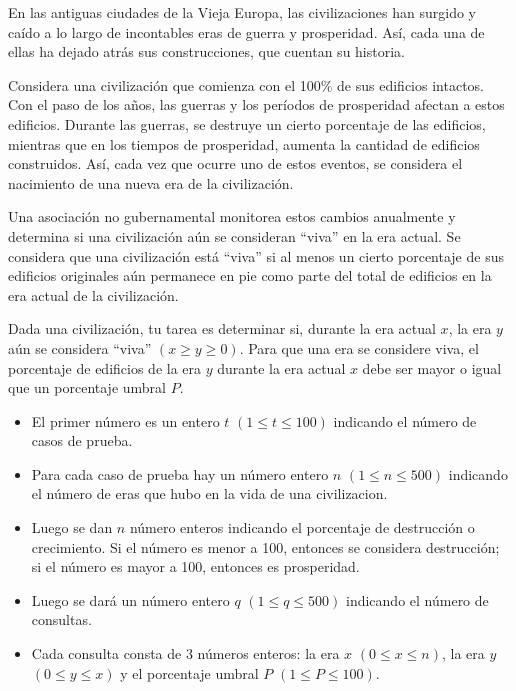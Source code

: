 
En las antiguas ciudades de la Vieja Europa, las civilizaciones han surgido y caído a lo largo de incontables eras de guerra y prosperidad. Así, cada una de ellas ha dejado atrás sus construcciones, que cuentan su historia.

Considera una civilización que comienza con el 100\% de sus edificios intactos. Con el paso de los años, las guerras y los períodos de prosperidad afectan a estos edificios. Durante las guerras, se destruye un cierto porcentaje de las edificios, mientras que en los tiempos de prosperidad, aumenta la cantidad de edificios construidos. Así, cada vez que ocurre uno de estos eventos, se considera el nacimiento de una nueva era de la civilización.

Una asociación no gubernamental monitorea estos cambios anualmente y determina si una civilización aún se consideran ``viva'' en la era actual. Se considera que una civilización está ``viva'' si al menos un cierto porcentaje de sus edificios originales aún permanece en pie como parte del total de edificios en la era actual de la civilización.

Dada una civilización, tu tarea es determinar si, durante la era actual $x$, la era $y$ aún se considera ``viva'' $(x \geq y \geq 0)$. Para que una era se considere viva, el porcentaje de edificios de la era $y$ durante la era actual $x$ debe ser mayor o igual que un porcentaje umbral $P$.


\begin{itemize}
    \item El primer número es un entero $t$ $(1 \leq t \leq 100)$ indicando el número de casos de prueba.
    \item Para cada caso de prueba hay un número entero $n$ $(1 \leq n \leq 500)$ indicando el número de eras que hubo en la vida de una civilizacion.
    \item Luego se dan $n$ número enteros indicando el porcentaje de destrucción o crecimiento. Si el número es menor a 100, entonces se considera destrucción; si el número es mayor a 100, entonces es prosperidad.
    \item Luego se dará un número entero $q$ $(1 \leq q \leq 500)$ indicando el número de consultas.
    \item Cada consulta consta de 3 números enteros: la era $x$ $(0 \leq x \leq n)$, la era $y$ $(0 \leq y \leq x)$ y el porcentaje umbral $P$  $(1 \leq P \leq 100)$.
\end{itemize}

